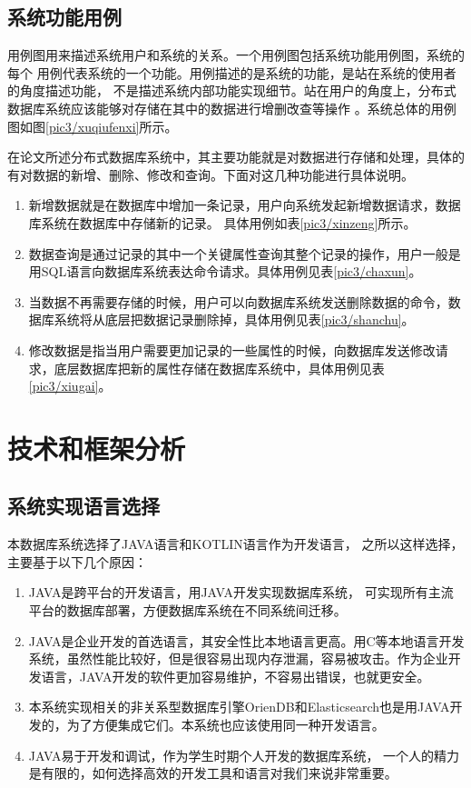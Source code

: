 \subsection{系统功能用例}
用例图用来描述系统用户和系统的关系。一个用例图包括系统功能用例图，系统的每个
用例代表系统的一个功能。用例描述的是系统的功能，是站在系统的使用者的角度描述功能，
不是描述系统内部功能实现细节。站在用户的角度上，分布式数据库系统应该能够对存储在其中的数据进行增删改查等操作
。系统总体的用例图如图\ref{pic3/xuqiufenxi}所示。

在论文所述分布式数据库系统中，其主要功能就是对数据进行存储和处理，具体的有对数据的新增、删除、修改和查询。下面对这几种功能进行具体说明。
\begin{enumerate}[fullwidth,itemindent=2em,listparindent=2em]
	\item 新增数据就是在数据库中增加一条记录，用户向系统发起新增数据请求，数据库系统在数据库中存储新的记录。
	具体用例如表\ref{pic3/xinzeng}所示。
	\item 数据查询是通过记录的其中一个关键属性查询其整个记录的操作，用户一般是用SQL语言向数据库系统表达命令请求。具体用例见表\ref{pic3/chaxun}。
\item 当数据不再需要存储的时候，用户可以向数据库系统发送删除数据的命令，数据库系统将从底层把数据记录删除掉，具体用例见表\ref{pic3/shanchu}。
\item 	修改数据是指当用户需要更加记录的一些属性的时候，向数据库发送修改请求，底层数据库把新的属性存储在数据库系统中，具体用例见表\ref{pic3/xiugai}。
\end{enumerate}
\section{技术和框架分析}
\subsection{系统实现语言选择}
本数据库系统选择了JAVA语言和KOTLIN语言作为开发语言，
之所以这样选择，主要基于以下几个原因：
\begin{enumerate}[fullwidth,itemindent=2em,listparindent=2em]
	\item JAVA是跨平台的开发语言，用JAVA开发实现数据库系统，
	可实现所有主流平台的数据库部署，方便数据库系统在不同系统间迁移。
	\item JAVA是企业开发的首选语言，其安全性比本地语言更高。用C等本地语言开发系统，虽然性能比较好，但是很容易出现内存泄漏，容易被攻击。作为企业开发语言，JAVA开发的软件更加容易维护，不容易出错误，也就更安全。
	\item 本系统实现相关的非关系型数据库引擎OrienDB和Elasticsearch也是用JAVA开发的，为了方便集成它们。本系统也应该使用同一种开发语言。
	\item JAVA易于开发和调试，作为学生时期个人开发的数据库系统，
	一个人的精力是有限的，如何选择高效的开发工具和语言对我们来说非常重要。
\end{enumerate}
